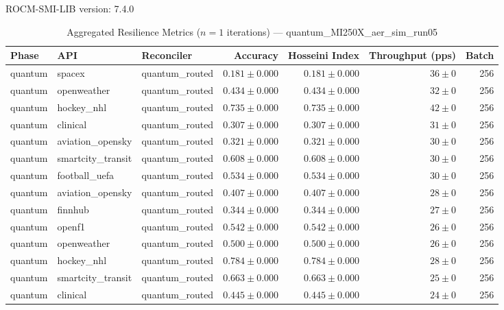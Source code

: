 ROCM-SMI-LIB version: 7.4.0

\begin{table}[htbp]
\caption{Aggregated Resilience Metrics ($n=1$ iterations) --- quantum_MI250X_aer_sim_run05}
\begin{tabular}{l l l r r r r}
\hline
Phase & API & Reconciler & Accuracy & Hosseini Index & Throughput (pps) & Batch \\
\hline
quantum & spacex & quantum\_routed & $0.181\pm0.000$ & $0.181\pm0.000$ & $36\pm0$ & 256 \\
quantum & openweather & quantum\_routed & $0.434\pm0.000$ & $0.434\pm0.000$ & $32\pm0$ & 256 \\
quantum & hockey\_nhl & quantum\_routed & $0.735\pm0.000$ & $0.735\pm0.000$ & $42\pm0$ & 256 \\
quantum & clinical & quantum\_routed & $0.307\pm0.000$ & $0.307\pm0.000$ & $31\pm0$ & 256 \\
quantum & aviation\_opensky & quantum\_routed & $0.321\pm0.000$ & $0.321\pm0.000$ & $30\pm0$ & 256 \\
quantum & smartcity\_transit & quantum\_routed & $0.608\pm0.000$ & $0.608\pm0.000$ & $30\pm0$ & 256 \\
quantum & football\_uefa & quantum\_routed & $0.534\pm0.000$ & $0.534\pm0.000$ & $30\pm0$ & 256 \\
quantum & aviation\_opensky & quantum\_routed & $0.407\pm0.000$ & $0.407\pm0.000$ & $28\pm0$ & 256 \\
quantum & finnhub & quantum\_routed & $0.344\pm0.000$ & $0.344\pm0.000$ & $27\pm0$ & 256 \\
quantum & openf1 & quantum\_routed & $0.542\pm0.000$ & $0.542\pm0.000$ & $26\pm0$ & 256 \\
quantum & openweather & quantum\_routed & $0.500\pm0.000$ & $0.500\pm0.000$ & $26\pm0$ & 256 \\
quantum & hockey\_nhl & quantum\_routed & $0.784\pm0.000$ & $0.784\pm0.000$ & $28\pm0$ & 256 \\
quantum & smartcity\_transit & quantum\_routed & $0.663\pm0.000$ & $0.663\pm0.000$ & $25\pm0$ & 256 \\
quantum & clinical & quantum\_routed & $0.445\pm0.000$ & $0.445\pm0.000$ & $24\pm0$ & 256 \\

\end{tabular}
\end{table}
